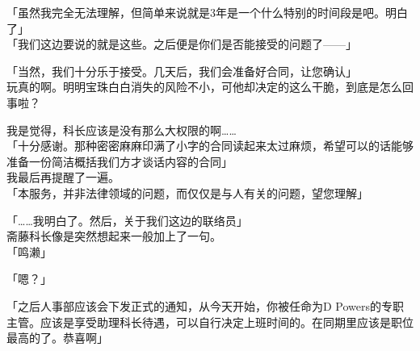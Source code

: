 「虽然我完全无法理解，但简单来说就是3年是一个什么特别的时间段是吧。明白了」\\

「我们这边要说的就是这些。之后便是你们是否能接受的问题了——」

「当然，我们十分乐于接受。几天后，我们会准备好合同，让您确认」\\

玩真的啊。明明宝珠白白消失的风险不小，可他却决定的这么干脆，到底是怎么回事啦？

我是觉得，科长应该是没有那么大权限的啊……\\

「十分感谢。那种密密麻麻印满了小字的合同读起来太过麻烦，希望可以的话能够准备一份简洁概括我们方才谈话内容的合同」\\

我最后再提醒了一遍。\\

「本服务，并非法律领域的问题，而仅仅是与人有关的问题，望您理解」

「……我明白了。然后，关于我们这边的联络员」\\

斋藤科长像是突然想起来一般加上了一句。\\

「鸣濑」

「嗯？」

「之后人事部应该会下发正式的通知，从今天开始，你被任命为D Powers的专职主管。应该是享受助理科长待遇，可以自行决定上班时间的。在同期里应该是职位最高的了。恭喜啊」

